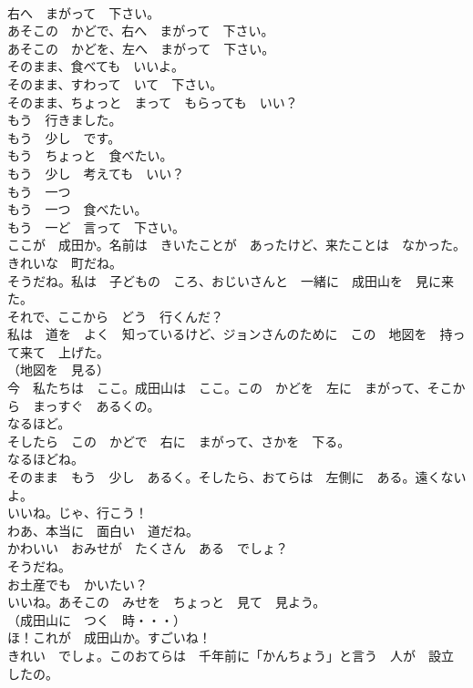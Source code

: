 \documentclass[8pt]{extreport}
\begin{document}
\begin{CJK}{UTF8}{min}
\\	右へ　まがって　下さい。	
\\	あそこの　かどで、右へ　まがって　下さい。	
\\	あそこの　かどを、左へ　まがって　下さい。	
\\	そのまま、食べても　いいよ。	
\\	そのまま、すわって　いて　下さい。	
\\	そのまま、ちょっと　まって　もらっても　いい？	
\\	もう　行きました。	
\\	もう　少し　です。	
\\	もう　ちょっと　食べたい。	
\\	もう　少し　考えても　いい？	
\\	もう　一つ	
\\	もう　一つ　食べたい。	
\\	もう　一ど　言って　下さい。	
\\	ここが　成田か。名前は　きいたことが　あったけど、来たことは　なかった。きれいな　町だね。	
\\	そうだね。私は　子どもの　ころ、おじいさんと　一緒に　成田山を　見に来た。	
\\	それで、ここから　どう　行くんだ？	
\\	私は　道を　よく　知っているけど、ジョンさんのために　この　地図を　持って来て　上げた。	
\\	（地図を　見る）	
\\	今　私たちは　ここ。成田山は　ここ。この　かどを　左に　まがって、そこから　まっすぐ　あるくの。	
\\	なるほど。	
\\	そしたら　この　かどで　右に　まがって、さかを　下る。	
\\	なるほどね。	
\\	そのまま　もう　少し　あるく。そしたら、おてらは　左側に　ある。遠くないよ。	
\\	いいね。じゃ、行こう！	
\\	わあ、本当に　面白い　道だね。	
\\	かわいい　おみせが　たくさん　ある　でしょ？	
\\	そうだね。	
\\	お土産でも　かいたい？	
\\	いいね。あそこの　みせを　ちょっと　見て　見よう。	
\\	（成田山に　つく　時・・・）	
\\	ほ！これが　成田山か。すごいね！	
\\	きれい　でしょ。このおてらは　千年前に「かんちょう」と言う　人が　設立　したの。	

\end{CJK}
\end{document}
